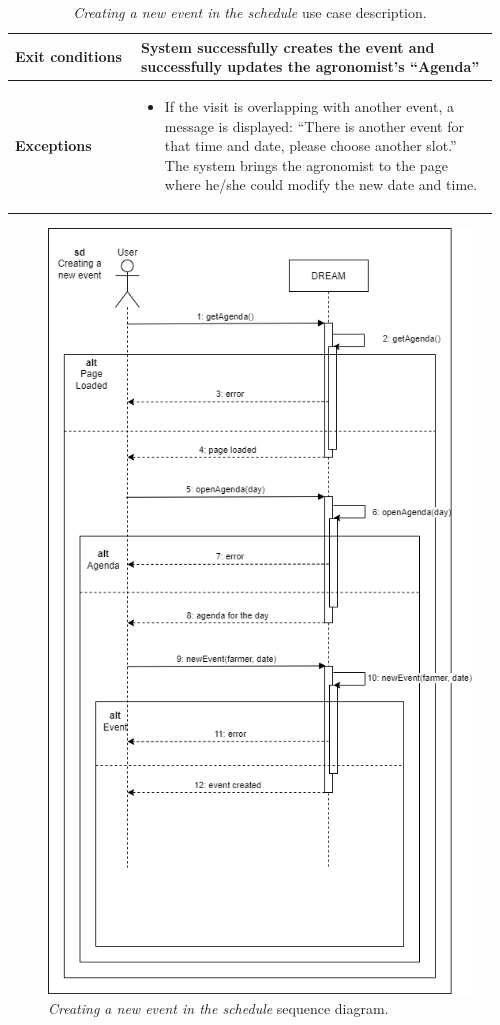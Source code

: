 \begin{table}[H]
\begin{tabular}{@{}p{0.25\linewidth}p{0.71\linewidth}@{}}
        \hline
        \textbf{Exit conditions} & System successfully creates the event and successfully updates the agronomist’s “Agenda”\\
        \hline
        \textbf{Exceptions} &
        \begin{itemize}[leftmargin=.4cm,noitemsep,topsep=0pt,before=\vspace{-3mm},after=\vspace{-4mm}]
            \item If the visit is overlapping with another event, a message is displayed: “There is another event for that time and date, please choose another slot.” The system brings the agronomist to the page where he/she could modify the new date and time.
        \end{itemize} \\
        \hline
    \end{tabular}
    \caption{\textit{Creating a new event in the schedule} use case description.}
\end{table}
\begin{figure}[H]
    \centering
    \includegraphics[height=1.5\linewidth]{Images/Use Case/UC18.png}
    \caption{\textit{Creating a new event in the schedule} sequence diagram.}
\end{figure}
\newpage

